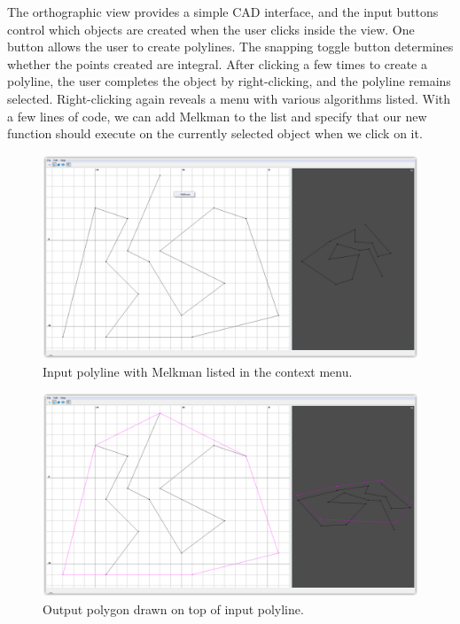 The orthographic view provides a simple CAD interface, and the input buttons
control which objects are created when the user clicks inside the view. One
button allows the user to create polylines. The snapping toggle button
determines whether the points created are integral.  After clicking a few times
to create a polyline, the user completes the object by right-clicking, and the
polyline remains selected. Right-clicking again reveals a menu with various
algorithms listed. With a few lines of code, we can add Melkman to the list and
specify that our new function should execute on the currently selected object
when we click on it.

\begin{figure}[H]
	\centering
	\includegraphics[width=\textwidth]{figures/melkman-input-1}
	\caption{Input polyline with Melkman listed in the context menu.} 
	\label{fig:melkman-input}
\end{figure}

\begin{figure}[H]
	\centering
	\includegraphics[width=\textwidth]{figures/melkman-output-1}
	\caption{Output polygon drawn on top of input polyline.} 
	\label{fig:melkman-output}
\end{figure}

